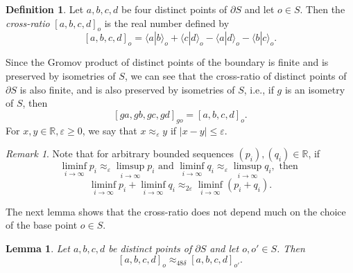 \documentclass[11pt,letterpaper]{article}
\newcommand{\RR}{\mathbb{R}}
\renewcommand{\l}{\langle}
\renewcommand{\r}{\rangle}
\newtheorem{lem}[thm]{Lemma}
\theoremstyle{definition}
\newtheorem{defn}[thm]{Definition}
\theoremstyle{remark}
\newtheorem{rem}[thm]{Remark}
\begin{document}
\begin{defn}
Let $a, b, c, d$ be four distinct points of $\partial S$ and let $o \in S$. Then the {\it cross-ratio} $[a, b, c, d]_o$ is the real number defined by
\begin{equation}\label{useful definition}
[a, b, c, d]_o = \l a|b\r_o+\l c|d\r_o-\l a|d\r_o-\l b|c\r_o.
\end{equation} 

\end{defn}


Since the Gromov product of distinct points of the boundary is finite and is preserved by isometries of $S$, we can see that the cross-ratio of distinct points of $\partial S$ is also finite, and is also preserved by isometries of $S$, i.e., if $g$ is an isometry of $S$, then 
$$
[ga, gb, gc, gd]_{go}=[a, b, c, d]_o.
$$
For $x,y \in \RR, \varepsilon \geq 0$, we say that $x \approx_{\varepsilon}y$ if $\left|x - y\right|\leq \varepsilon$.
\begin{rem}\label{technical}
Note that for arbitrary bounded sequences $(p_i), (q_i) \in \RR$, if 
$$\liminf_{i \rightarrow \infty} p_i \approx_{\varepsilon} \limsup_{i \rightarrow \infty} p_i \text{ and } \liminf_{i \rightarrow \infty} q_i \approx_{\varepsilon} \limsup_{i \rightarrow \infty} q_i, \text{ then }
$$
$$
\liminf_{i \rightarrow \infty} p_i+\liminf_{i \rightarrow \infty} q_i \approx_{2\varepsilon} \liminf_{i \rightarrow \infty} \left(p_i+q_i\right).
$$
\end{rem}
The next lemma shows that the cross-ratio does not depend much on the choice of the base point $o \in S$.
\begin{lem}\label{cross-ratio doesn't depend on o}
Let $a,b,c,d$ be distinct points of $\partial S$ and let $o, o' \in S$. Then
$$
[a,b,c,d]_o \approx_{48\delta} [a,b,c,d]_{o'}.
$$
\end{lem}
\end{document}
